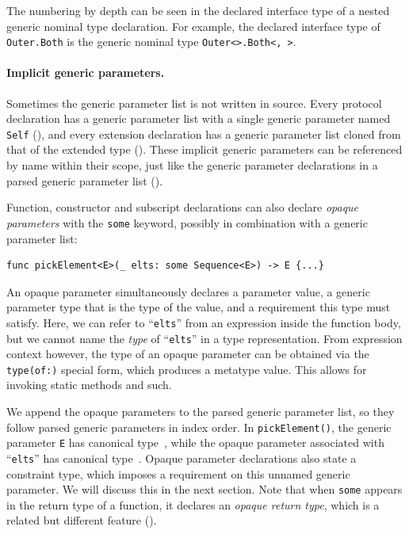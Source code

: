 \documentclass[../generics]{subfiles}
\begin{document}
The numbering by depth can be seen in the declared interface type of a nested generic nominal type declaration. For example, the declared interface type of \texttt{Outer.Both} is the generic nominal type \texttt{Outer<>.Both<, >}.

\paragraph{Implicit generic parameters.} Sometimes the generic parameter list is not written in source. Every protocol declaration has a generic parameter list with a single generic parameter named \texttt{Self} (), and every extension declaration has a generic parameter list cloned from that of the extended type (). These implicit generic parameters can be referenced by name within their scope, just like the generic parameter declarations in a parsed generic parameter list ().

Function, constructor and subscript declarations can also declare \emph{opaque parameters} with the \texttt{some} keyword, possibly in combination with a generic parameter list:
\begin{Verbatim}
func pickElement<E>(_ elts: some Sequence<E>) -> E {...}
\end{Verbatim}
An opaque parameter simultaneously declares a parameter value, a generic parameter type that is the type of the value, and a requirement this type must satisfy. Here, we can refer to ``\texttt{elts}'' from an expression inside the function body, but we cannot name the \emph{type} of ``\texttt{elts}'' in a type representation. From expression context however, the type of an opaque parameter can be obtained via the \texttt{type(of:)} special form, which produces a metatype value. This allows for invoking static methods and such.

We append the opaque parameters to the parsed generic parameter list, so they follow parsed generic parameters in index order. In \texttt{pickElement()}, the generic parameter \texttt{E} has canonical type~\rT, while the opaque parameter associated with ``\texttt{elts}'' has canonical type~\rU. Opaque parameter declarations also state a constraint type, which imposes a requirement on this unnamed generic parameter. We will discuss this in the next section. Note that when \texttt{some} appears in the return type of a function, it declares an \emph{opaque return type}, which is a related but different feature ().
\end{document}
